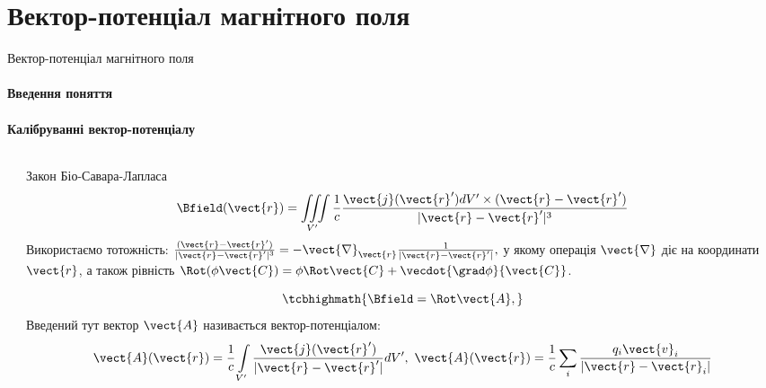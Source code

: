 \documentclass{beamer}
\begin{document}
\section{Вектор-потенціал магнітного поля}


\begin{frame}[t]{Вектор-потенціал магнітного поля}{}
	\framesubtitle<1>{Введення поняття}
	\framesubtitle<2>{Калібруванні вектор-потенціалу}
	\begin{columns}
		\begin{column}{0.3\linewidth}\centering
			
		\end{column}
		\begin{column}{0.7\linewidth}
			\begin{overprint}
				\begin{block}{}
					Закон Біо-Савара-Лапласа
					\begin{equation*}
						\Bfield(\vect{r}) = \iiint\limits_{V'} \frac1c \frac{ \vect{j}(\vect{r}')dV'\times(\vect{r} - \vect{r}') }{|\vect{r} -
							\vect{r}'|^3}
					\end{equation*}
					{\small
					Використаємо тотожність:
					\(
					\frac{ (\vect{r} - \vect{r}') }{|\vect{r} - \vect{r}'|^3} = - \vect{\nabla}_{\vect{r}} \frac{ 1 }{|\vect{r} - \vect{r}'|},
					\)
					у якому операція $\vect{\nabla}$ діє на координати $\vect{r}$, а також рівність
					$\Rot(\phi\vect{C}) = \phi\Rot\vect{C} + \vecdot{\grad\phi}{\vect{C}} $.}
				\end{block}
				\onslide<2>
				\begin{block}{}
					\begin{equation*}
						\tcbhighmath{\Bfield = \Rot\vect{A},}
					\end{equation*}
					Введений тут вектор $\vect{A}$ називається \alert{вектор-потенціалом}:
					\begin{equation*}
						\vect{A}(\vect{r}) = \frac1c \int\limits_{V'} \frac{\vect{j}(\vect{r}')}{|\vect{r} - \vect{r}'|} dV',
						\
						\vect{A}(\vect{r}) = \frac1c \sum\limits_i \frac{q_i\vect{v}_i}{|\vect{r} - \vect{r}_i|}
					\end{equation*}
				\end{block}
			\end{overprint}
		\end{column}
	\end{columns}

\end{frame}
\end{document}
